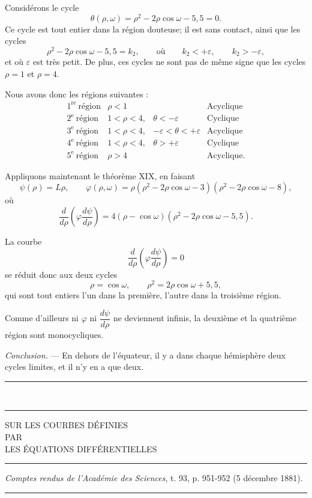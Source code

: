 \documentclass[11pt]{article}
\newcommand{\ornament}{\begin{center}\rule{2.5em}{0.4pt}\,\raisebox{0.1ex}{\tiny$\bullet\bullet\bullet$}\,\rule{2.5em}{0.4pt}\end{center}}
\newcommand{\shortline}{\begin{center}\rule{3.5em}{0.4pt}\end{center}}
\begin{document}
Considérons le cycle
\[
\theta(\rho,\omega)=\rho^2-2\rho\cos\omega-5{,}5=0.
\]
Ce cycle est tout entier dans la région douteuse; il est sans contact, ainsi que les cycles
\[
\rho^2-2\rho\cos\omega-5{,}5=k_2,
\qquad\text{où}\qquad
k_2<+\varepsilon,
\qquad
k_2>-\varepsilon,
\]
et où $\varepsilon$ est très petit. De plus, ces cycles ne sont pas de même signe que les cycles $\rho=1$ et $\rho=4$.

Nous avons donc les régions suivantes :
\[
\begin{array}{llll}
1^{\mathrm{re}}\ \text{région} & \rho<1 & & \text{Acyclique}\\
2^{\mathrm{e}}\ \text{région} & 1<\rho<4, & \theta< -\varepsilon & \text{Cyclique}\\
3^{\mathrm{e}}\ \text{région} & 1<\rho<4, & -\varepsilon<\theta<+\varepsilon & \text{Acyclique}\\
4^{\mathrm{e}}\ \text{région} & 1<\rho<4, & \theta>+\varepsilon & \text{Cyclique}\\
5^{\mathrm{e}}\ \text{région} & \rho>4 & & \text{Acyclique.}
\end{array}
\]

Appliquons maintenant le théorème XIX, en faisant
\[
\psi(\rho)=L\rho,
\qquad
\varphi(\rho,
\omega)=\rho(\rho^2-2\rho\cos\omega-3)(\rho^2-2\rho\cos\omega-8),
\]
où
\[
\frac{d}{d\rho}\left(\varphi\frac{d\psi}{d\rho}\right)=4(\rho-
\cos\omega)(\rho^2-2\rho\cos\omega-5{,}5).
\]

La courbe
\[
\frac{d}{d\rho}\left(\varphi\frac{d\psi}{d\rho}\right)=0
\]
se réduit donc aux deux cycles
\[
\rho=\cos\omega,
\qquad
\rho^2=2\rho\cos\omega+5{,}5,
\]
qui sont tout entiers l’un dans la première, l’autre dans la troisième région.

Comme d’ailleurs ni $\varphi$ ni $\dfrac{d\psi}{d\rho}$ ne deviennent infinis, la deuxième et la quatrième région sont monocycliques.

\emph{Conclusion.} --- En dehors de l’équateur, il y a dans chaque hémisphère deux cycles limites, et il n’y en a que deux.

\ornament


\begin{center}
{\Large SUR LES COURBES DÉFINIES}\\[0.8em]
{\small PAR}\\[0.8em]
{\large LES ÉQUATIONS DIFFÉRENTIELLES}
\end{center}
\shortline
\begin{center}
\emph{Comptes rendus de l’Académie des Sciences}, t. 93, p. 951-952 (5 décembre 1881).
\end{center}
\shortline
\end{document}
